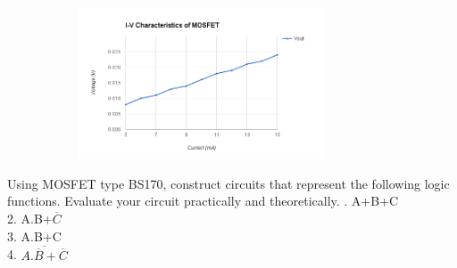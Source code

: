 {\begin{solution}
\begin{figure}[h!]
\begin{subfigure}[H]{0.5\textwidth}
			\end{subfigure}
			\begin{subfigure}[H]{0.7\textwidth}
				\includegraphics[width=0.8\textwidth]{images/plot424.png}
			\end{subfigure}
		\end{figure}
	\end{solution}
	\clearpage
	\begin{problem}
		Using MOSFET type BS170, construct circuits that represent the following logic functions. Evaluate your circuit practically and theoretically.
		. A+B+C \\
		2. A.B+\(\overline{C}\) \\
		3. A.B+C \\
		4. \(\overline{A.\overline{B}+\overline{C}}\)
	\end{problem}
	
}

